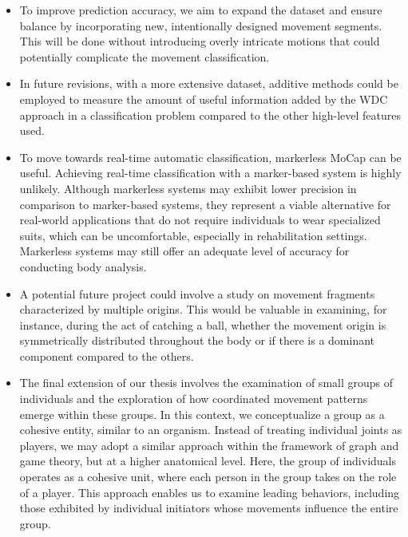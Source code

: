 \begin{itemize}
    \item To improve prediction accuracy, we aim to expand the dataset and ensure balance by incorporating new, intentionally designed movement segments.
        This will be done without introducing overly intricate motions that could potentially complicate the movement classification.
    \item In future revisions, with a more extensive dataset, additive methods could be employed to measure the amount of useful information added by the WDC approach in a classification problem compared to the other high-level features used.
    \item To move towards real-time automatic classification, markerless MoCap can be useful.
        Achieving real-time classification with a marker-based system is highly unlikely.
        Although markerless systems may exhibit lower precision in comparison to marker-based systems, 
        they represent a viable alternative for real-world applications that do not require individuals to wear specialized suits, which can be uncomfortable, especially in rehabilitation settings. 
        Markerless systems may still offer an adequate level of accuracy for conducting body analysis.
    \item A potential future project could involve a study on movement fragments characterized by multiple origins.
        This would be valuable in examining, for instance, during the act of catching a ball, whether the movement origin is symmetrically distributed throughout the body or if there is a dominant component compared to the others.
    \item The final extension of our thesis involves the examination of small groups of individuals and the exploration of how coordinated movement patterns emerge within these groups.
        In this context, we conceptualize a group as a cohesive entity, similar to an organism.
        Instead of treating individual joints as players, we may adopt a similar approach within the framework of graph and game theory, but at a higher anatomical level.
        Here, the group of individuals operates as a cohesive unit, where each person in the group takes on the role of a player. 
        This approach enables us to examine leading behaviors, including those exhibited by individual initiators whose movements influence the entire group.
\end{itemize}